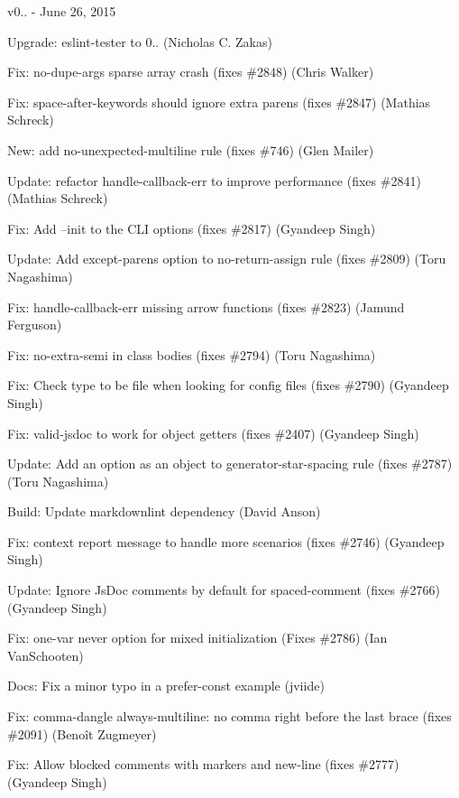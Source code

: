 v0.. -\/ June 26, 2015


\begin{DoxyItemize}
\item Upgrade\+: eslint-\/tester to 0.. (Nicholas C. Zakas)
\item Fix\+: no-\/dupe-\/args sparse array crash (fixes \#2848) (Chris Walker)
\item Fix\+: space-\/after-\/keywords should ignore extra parens (fixes \#2847) (Mathias Schreck)
\item New\+: add no-\/unexpected-\/multiline rule (fixes \#746) (Glen Mailer)
\item Update\+: refactor handle-\/callback-\/err to improve performance (fixes \#2841) (Mathias Schreck)
\item Fix\+: Add --init to the C\+LI options (fixes \#2817) (Gyandeep Singh)
\item Update\+: Add {\ttfamily except-\/parens} option to {\ttfamily no-\/return-\/assign} rule (fixes \#2809) (Toru Nagashima)
\item Fix\+: handle-\/callback-\/err missing arrow functions (fixes \#2823) (Jamund Ferguson)
\item Fix\+: {\ttfamily no-\/extra-\/semi} in class bodies (fixes \#2794) (Toru Nagashima)
\item Fix\+: Check type to be file when looking for config files (fixes \#2790) (Gyandeep Singh)
\item Fix\+: valid-\/jsdoc to work for object getters (fixes \#2407) (Gyandeep Singh)
\item Update\+: Add an option as an object to {\ttfamily generator-\/star-\/spacing} rule (fixes \#2787) (Toru Nagashima)
\item Build\+: Update markdownlint dependency (David Anson)
\item Fix\+: context report message to handle more scenarios (fixes \#2746) (Gyandeep Singh)
\item Update\+: Ignore Js\+Doc comments by default for {\ttfamily spaced-\/comment} (fixes \#2766) (Gyandeep Singh)
\item Fix\+: one-\/var \textquotesingle{}never\textquotesingle{} option for mixed initialization (Fixes \#2786) (Ian Van\+Schooten)
\item Docs\+: Fix a minor typo in a prefer-\/const example (jviide)
\item Fix\+: comma-\/dangle always-\/multiline\+: no comma right before the last brace (fixes \#2091) (Benoît Zugmeyer)
\item Fix\+: Allow blocked comments with markers and new-\/line (fixes \#2777) (Gyandeep Singh)

\end{DoxyItemize}
